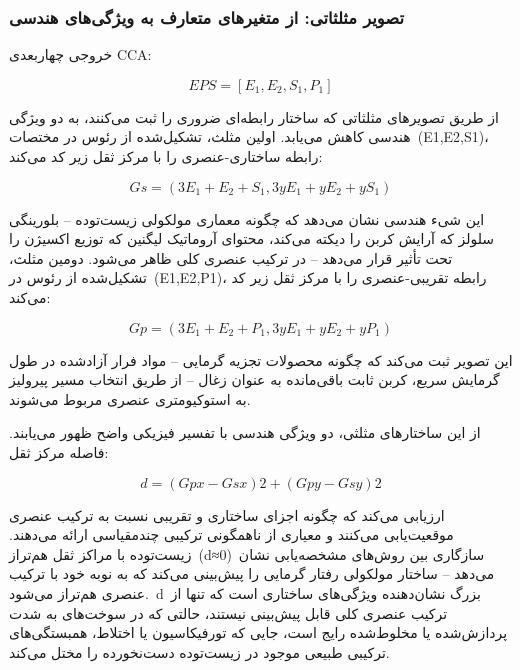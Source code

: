 \documentclass[12pt, a4paper]{article}
\begin{document}
\subsubsection{تصویر مثلثاتی: از متغیرهای متعارف به ویژگی‌های هندسی}

خروجی چهاربعدی CCA:

\begin{equation}
EPS=[E_{1},E_{2},S_{1},P_{1}]
\end{equation}

از طریق تصویرهای مثلثاتی که ساختار رابطه‌ای ضروری را ثبت می‌کنند، به دو ویژگی هندسی کاهش می‌یابد. اولین مثلث، تشکیل‌شده از رئوس در مختصات (E1,E2,S1)، رابطه ساختاری-عنصری را با مرکز ثقل زیر کد می‌کند:

\begin{equation}
Gs=(3E_{1}+E_{2}+S_{1},3yE_{1}+yE_{2}+yS_{1})
\end{equation}

این شیء هندسی نشان می‌دهد که چگونه معماری مولکولی زیست‌توده – بلورینگی سلولز که آرایش کربن را دیکته می‌کند، محتوای آروماتیک لیگنین که توزیع اکسیژن را تحت تأثیر قرار می‌دهد – در ترکیب عنصری کلی ظاهر می‌شود. دومین مثلث، تشکیل‌شده از رئوس در (E1,E2,P1)، رابطه تقریبی-عنصری را با مرکز ثقل زیر کد می‌کند:

\begin{equation}
Gp=(3E_{1}+E_{2}+P_{1},3yE_{1}+yE_{2}+yP_{1})
\end{equation}

این تصویر ثبت می‌کند که چگونه محصولات تجزیه گرمایی – مواد فرار آزادشده در طول گرمایش سریع، کربن ثابت باقی‌مانده به عنوان زغال – از طریق انتخاب مسیر پیرولیز به استوکیومتری عنصری مربوط می‌شوند.

از این ساختارهای مثلثی، دو ویژگی هندسی با تفسیر فیزیکی واضح ظهور می‌یابند. فاصله مرکز ثقل:

\begin{equation}
d=(Gpx-Gsx)2+(Gpy-Gsy)2
\end{equation}

ارزیابی می‌کند که چگونه اجزای ساختاری و تقریبی نسبت به ترکیب عنصری موقعیت‌یابی می‌کنند و معیاری از ناهمگونی ترکیبی چندمقیاسی ارائه می‌دهند. زیست‌توده با مراکز ثقل هم‌تراز (d≈0) سازگاری بین روش‌های مشخصه‌یابی نشان می‌دهد – ساختار مولکولی رفتار گرمایی را پیش‌بینی می‌کند که به نوبه خود با ترکیب عنصری هم‌تراز می‌شود. d بزرگ نشان‌دهنده ویژگی‌های ساختاری است که تنها از ترکیب عنصری کلی قابل پیش‌بینی نیستند، حالتی که در سوخت‌های به شدت پردازش‌شده یا مخلوط‌شده رایج است، جایی که تورفیکاسیون یا اختلاط، همبستگی‌های ترکیبی طبیعی موجود در زیست‌توده دست‌نخورده را مختل می‌کند.
\end{document}
